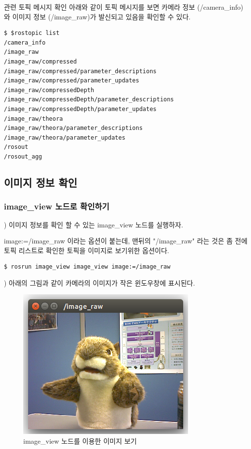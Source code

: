 \noindent
{}\circled{\thenum} 관련 토픽 메시지 확인
\noindent
아래와 같이 토픽 메시지를 보면 카메라 정보 (/camera\_info)와 이미지 정보 (/image\_raw)가 발신되고 있음을 확인할 수 있다.

\begin{lstlisting}[language=ROS]
$ $rostopic list
/camera_info
/image_raw
/image_raw/compressed
/image_raw/compressed/parameter_descriptions
/image_raw/compressed/parameter_updates
/image_raw/compressedDepth
/image_raw/compressedDepth/parameter_descriptions
/image_raw/compressedDepth/parameter_updates
/image_raw/theora
/image_raw/theora/parameter_descriptions
/image_raw/theora/parameter_updates
/rosout
/rosout_agg
\end{lstlisting}

\subsection{이미지 정보 확인}

\subsubsection{image\_view 노드로 확인하기}

\setcounter{num}{0}

\noindent
{}\thenum) 이미지 정보를 확인 할 수 있는 image\_view 노드를 실행하자.

\noindent
image:=/image\_raw 이라는 옵션이 붙는데, 맨뒤의 "/image\_raw" 라는 것은 좀 전에 토픽 리스트로 확인한 토픽을 이미지로 보기위한 옵션이다.

\begin{lstlisting}[language=ROS]
$ rosrun image_view image_view image:=/image_raw
\end{lstlisting}

\noindent
{}\thenum) 아래의 그림과 같이 카메라의 이미지가 작은 윈도우창에 표시된다.

\begin{figure}[h]
\centering\includegraphics[width=0.5\columnwidth]{pictures/chapter9/imageview.png}
\caption{image\_view 노드를 이용한 이미지 보기}
\end{figure}

